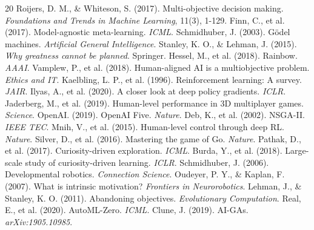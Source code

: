 \documentclass{article}
\begin{document}

\begin{thebibliography}{20}
 Roijers, D. M., \& Whiteson, S. (2017). Multi-objective decision making. \textit{Foundations and Trends in Machine Learning}, 11(3), 1-129.
 Finn, C., et al. (2017). Model-agnostic meta-learning. \textit{ICML}.
 Schmidhuber, J. (2003). G{\"o}del machines. \textit{Artificial General Intelligence}.
 Stanley, K. O., \& Lehman, J. (2015). \textit{Why greatness cannot be planned}. Springer.
 Hessel, M., et al. (2018). Rainbow. \textit{AAAI}.
 Vamplew, P., et al. (2018). Human-aligned AI is a multiobjective problem. \textit{Ethics and IT}.
 Kaelbling, L. P., et al. (1996). Reinforcement learning: A survey. \textit{JAIR}.
 Ilyas, A., et al. (2020). A closer look at deep policy gradients. \textit{ICLR}.
 Jaderberg, M., et al. (2019). Human-level performance in 3D multiplayer games. \textit{Science}.
 OpenAI. (2019). OpenAI Five. \textit{Nature}.
 Deb, K., et al. (2002). NSGA-II. \textit{IEEE TEC}.
 Mnih, V., et al. (2015). Human-level control through deep RL. \textit{Nature}.
 Silver, D., et al. (2016). Mastering the game of Go. \textit{Nature}.
 Pathak, D., et al. (2017). Curiosity-driven exploration. \textit{ICML}.
 Burda, Y., et al. (2018). Large-scale study of curiosity-driven learning. \textit{ICLR}.
 Schmidhuber, J. (2006). Developmental robotics. \textit{Connection Science}.
 Oudeyer, P. Y., \& Kaplan, F. (2007). What is intrinsic motivation? \textit{Frontiers in Neurorobotics}.
 Lehman, J., \& Stanley, K. O. (2011). Abandoning objectives. \textit{Evolutionary Computation}.
 Real, E., et al. (2020). AutoML-Zero. \textit{ICML}.
 Clune, J. (2019). AI-GAs. \textit{arXiv:1905.10985}.
\end{thebibliography}
\end{document}
